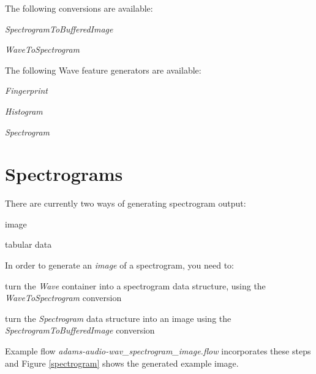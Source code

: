 \documentclass[a4paper]{book}
\begin{document}
\noindent The following conversions are available:
\begin{tight_itemize}
  \item \textit{SpectrogramToBufferedImage}
  \item \textit{WaveToSpectrogram}
\end{tight_itemize}

\noindent The following Wave feature generators are available:
\begin{tight_itemize}
  \item \textit{Fingerprint}
  \item \textit{Histogram}
  \item \textit{Spectrogram}
\end{tight_itemize}

\section{Spectrograms}
There are currently two ways of generating spectrogram output:
\begin{tight_itemize}
  \item image
  \item tabular data
\end{tight_itemize}

\noindent In order to generate an \textit{image} of a spectrogram, you need to:
\begin{tight_itemize}
  \item turn the \textit{Wave} container into a spectrogram data structure,
  using the \textit{WaveToSpectrogram} conversion
  \item turn the \textit{Spectrogram} data structure into an image using
  the \textit{SpectrogramToBufferedImage} conversion
\end{tight_itemize}
Example flow \textit{adams-audio-wav\_spectrogram\_image.flow} incorporates
these steps and Figure \ref{spectrogram} shows the generated example image.
\end{document}
